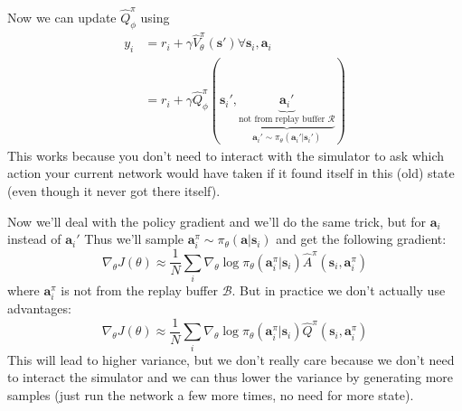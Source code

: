 \documentclass{report}
\begin{document}
Now we can update $\hat{Q}^\pi_\phi$ using
\begin{align}
		y_i &= r_i + \gamma \hat{V}^\pi_\theta(\bm{s}')\forall \bm{s}_i, \bm{a}_i \\
			&= r_i + \gamma \hat{Q}^\pi_\phi(\bm{s}_{i}', \underbrace{\underbrace{\bm{a}_{i}'}_{  \text{not from replay buffer }\mathcal{R}}}_{\bm{a}_i' \sim \pi_\theta(\bm{a}_i'|\bm{s}_i')})
\end{align}
This works because you don't need to interact with the simulator to ask which action your current network would have taken 
if it found itself in this (old) state (even though it never got there itself).

Now we'll deal with the policy gradient and we'll do the same trick, but for $\bm{a}_i$ instead of $\bm{a}_i'$
Thus we'll sample $\bm{a}_i^\pi \sim \pi_\theta(\bm{a}|\bm{s}_i)$ and get the following gradient:
\begin{equation}
		\nabla_\theta J(\theta) \approx \frac{1}{N} \sum_{i}^{} \nabla_{\theta}\log \pi_\theta(\bm{a}_i^\pi|\bm{s}_i) \hat{A}^\pi (\bm{s}_{i}, \bm{a}_{i}^\pi)
\end{equation}
where $\bm{a}_i^\pi$ is not from the replay buffer $\mathcal{B}$.
But in practice we don't actually use advantages:
\begin{equation}
		\nabla_\theta J(\theta) \approx \frac{1}{N} \sum_{i}^{} \nabla_{\theta}\log \pi_\theta(\bm{a}_i^\pi|\bm{s}_i) \hat{Q}^\pi (\bm{s}_{i}, \bm{a}_{i}^\pi)
\end{equation}
This will lead to higher variance, but we don't really care because we don't need to interact the simulator
and we can thus lower the variance by generating more samples (just run the network a few more times, no need for more state).
\end{document}
